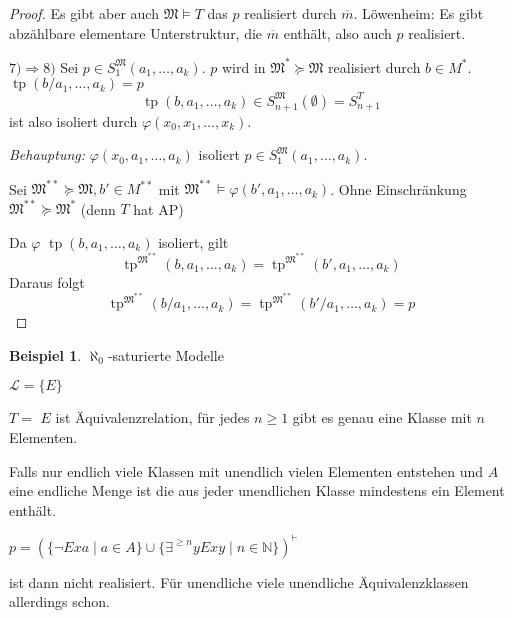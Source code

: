 \documentclass[12pt,parskip=full]{scrartcl}
\newcommand{\setN}{\mathbb{N}}
\newcommand{\heading}{\underline}
\theoremstyle{definition}
\newtheorem{example}[theorem]{Beispiel}
\begin{document}
\begin{proof}
		Es gibt aber auch $\mathfrak{M} \models T$ das $p$ realisiert durch $\overline{m}$. Löwenheim: Es gibt abzählbare elementare Unterstruktur, die $\overline{m}$ enthält, also auch $p$ realisiert.
		
		\heading{$7) \Rightarrow 8)$} Sei $p \in S_1^\mathfrak{M}(a_1, \dots, a_k)$. $p$ wird in $\mathfrak{M}^* \succcurlyeq \mathfrak{M}$ realisiert durch $b \in M^*$. $\operatorname{tp}(b/a_1, \dots, a_k) = p$
		\begin{equation*}
			\operatorname{tp}(b, a_1, \dots, a_k) \in S_{n+1}^\mathfrak{M}(\emptyset) = S_{n+1}^T
		\end{equation*}
		ist also isoliert durch $\varphi(x_0, x_1, \dots, x_k)$.
		
		\textit{Behauptung:} $\varphi(x_0, a_1, \dots, a_k)$ isoliert $p \in S_1^\mathfrak{M}(a_1, \dots, a_k)$.
		
		Sei $\mathfrak{M}^{**} \succcurlyeq \mathfrak{M}, b' \in M^{**}$ mit $\mathfrak{M}^{**} \models \varphi(b', a_1, \dots, a_k)$. Ohne Einschränkung $\mathfrak{M}^{**} \succcurlyeq \mathfrak{M}^*$ (denn $T$ hat AP)
		
		Da $\varphi$ $\operatorname{tp}(b, a_1, \dots, a_k)$ isoliert, gilt
		\begin{equation*}
			\operatorname{tp}^{\mathfrak{M}^{**}}(b, a_1, \dots, a_k) = \operatorname{tp}^{\mathfrak{M}^{**}}(b', a_1, \dots, a_k)
		\end{equation*}
		Daraus folgt
		\begin{equation*}
			\operatorname{tp}^{\mathfrak{M}^{**}}(b / a_1, \dots, a_k) = \operatorname{tp}^{\mathfrak{M}^{**}}(b'/ a_1, \dots, a_k) = p
		\end{equation*}
	\end{proof}

	\begin{example}
		$\aleph_0$-saturierte Modelle
		
		$\mathcal{L} = \{ E \}$
		
		$T = $ $E$ ist Äquivalenzrelation, für jedes $n \geq 1$ gibt es genau eine Klasse mit $n$ Elementen.
		
		Falls nur endlich viele Klassen mit unendlich vielen Elementen entstehen und $A$ eine endliche Menge ist die aus jeder unendlichen Klasse mindestens ein Element enthält.
		
		$p = (\{ \lnot E x a \mid a \in A \} \cup \{ \exists^{\geq n} y E x y \mid n \in \setN \})^\vdash$
		
		ist dann nicht realisiert. Für unendliche viele unendliche Äquivalenzklassen allerdings schon.
	\end{example}
\end{document}
